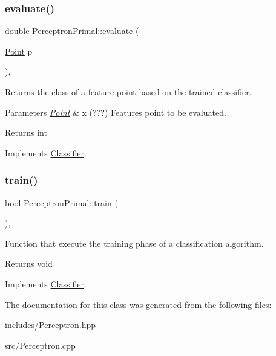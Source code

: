 \subsubsection{\texorpdfstring{evaluate()}{evaluate()}}
{\footnotesize\ttfamily double Perceptron\+Primal\+::evaluate (\begin{DoxyParamCaption}\item[{\hyperlink{class_point}{Point}}]{p }\end{DoxyParamCaption})\hspace{0.3cm}{\ttfamily [override]}, {\ttfamily [virtual]}}



Returns the class of a feature point based on the trained classifier. 


\begin{DoxyParams}{Parameters}
{\em \hyperlink{class_point}{Point}} & x (???) Features point to be evaluated. \\
\hline
\end{DoxyParams}
\begin{DoxyReturn}{Returns}
int 
\end{DoxyReturn}


Implements \hyperlink{class_classifier_ae8e9554823b85ddc2dcad2955da811d9}{Classifier}.

\mbox{\label{class_perceptron_primal_aea1195af5503b2dfb086aacc92acfdc9}} 
\subsubsection{\texorpdfstring{train()}{train()}}
{\footnotesize\ttfamily bool Perceptron\+Primal\+::train (\begin{DoxyParamCaption}{ }\end{DoxyParamCaption})\hspace{0.3cm}{\ttfamily [override]}, {\ttfamily [virtual]}}



Function that execute the training phase of a classification algorithm. 

\begin{DoxyReturn}{Returns}
void 
\end{DoxyReturn}


Implements \hyperlink{class_classifier_a2306a5de27555ab093593ac9642bc7d9}{Classifier}.



The documentation for this class was generated from the following files\+:\begin{DoxyCompactItemize}
\item 
includes/\hyperlink{_perceptron_8hpp}{Perceptron.\+hpp}\item 
src/Perceptron.\+cpp\end{DoxyCompactItemize}

